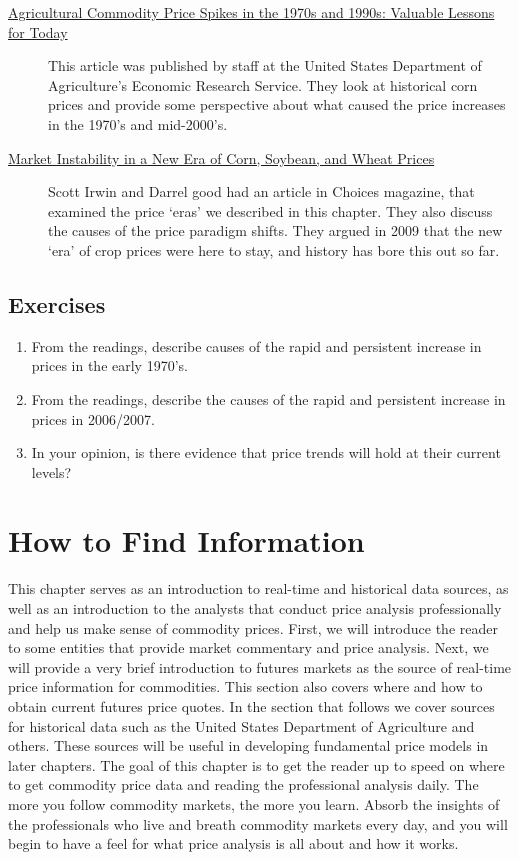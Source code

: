 \documentclass[]{book}
\theoremstyle{definition}
\theoremstyle{definition}
\theoremstyle{remark}
\begin{document}
\begin{description}
\item[\href{pdf-Readings/ers-amber-waves-2009-ag-com-pr-sp-1970s-1990s.pdf}{Agricultural
Commodity Price Spikes in the 1970s and 1990s: Valuable Lessons for
Today}]
This article was published by staff at the United States Department of
Agriculture's Economic Research Service. They look at historical corn
prices and provide some perspective about what caused the price
increases in the 1970's and mid-2000's.
\item[\href{http://www.choicesmagazine.org/magazine/pdf/article_56.pdf}{Market
Instability in a New Era of Corn, Soybean, and Wheat Prices}]
Scott Irwin and Darrel good had an article in Choices magazine, that
examined the price `eras' we described in this chapter. They also
discuss the causes of the price paradigm shifts. They argued in 2009
that the new `era' of crop prices were here to stay, and history has
bore this out so far.
\end{description}

\section{Exercises}\label{exercises}

\begin{enumerate}
\def\labelenumi{\arabic{enumi}.}
\item
  From the readings, describe causes of the rapid and persistent
  increase in prices in the early 1970's.
\item
  From the readings, describe the causes of the rapid and persistent
  increase in prices in 2006/2007.
\item
  In your opinion, is there evidence that price trends will hold at
  their current levels?
\end{enumerate}

\chapter{How to Find Information}\label{how-to-find-information}

This chapter serves as an introduction to real-time and historical data
sources, as well as an introduction to the analysts that conduct price
analysis professionally and help us make sense of commodity prices.
First, we will introduce the reader to some entities that provide market
commentary and price analysis. Next, we will provide a very brief
introduction to futures markets as the source of real-time price
information for commodities. This section also covers where and how to
obtain current futures price quotes. In the section that follows we
cover sources for historical data such as the United States Department
of Agriculture and others. These sources will be useful in developing
fundamental price models in later chapters. The goal of this chapter is
to get the reader up to speed on where to get commodity price data and
reading the professional analysis daily. The more you follow commodity
markets, the more you learn. Absorb the insights of the professionals
who live and breath commodity markets every day, and you will begin to
have a feel for what price analysis is all about and how it works.
\end{document}
